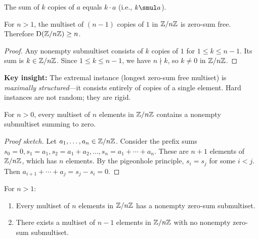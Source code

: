 \begin{theorem}
  \label{thm:sum_replicate}
  \leanok
  The sum of $k$ copies of $a$ equals $k \cdot a$ (i.e., $k \smul a$).
\end{theorem}

\begin{theorem}
  \label{thm:davenport_lower}
  \leanok
  For $n > 1$, the multiset of $(n-1)$ copies of $1$ in $\mathbb{Z}/n\mathbb{Z}$ is
  zero-sum free. Therefore $\mathrm{D}(\mathbb{Z}/n\mathbb{Z}) \geq n$.

  \begin{proof}
    Any nonempty submultiset consists of $k$ copies of $1$ for $1 \leq k \leq n-1$.
    Its sum is $k \in \mathbb{Z}/n\mathbb{Z}$. Since $1 \leq k \leq n-1$, we have $n \nmid k$,
    so $k \neq 0$ in $\mathbb{Z}/n\mathbb{Z}$.
  \end{proof}

  \textbf{Key insight:} The extremal instance (longest zero-sum free multiset)
  is \emph{maximally structured}---it consists entirely of copies of a single
  element. Hard instances are not random; they are rigid.
\end{theorem}

\begin{theorem}
  \label{thm:davenport_upper}
  For $n > 0$, every multiset of $n$ elements in $\mathbb{Z}/n\mathbb{Z}$ contains a
  nonempty submultiset summing to zero.

  \begin{proof}[Proof sketch]
    Let $a_1, \ldots, a_n \in \mathbb{Z}/n\mathbb{Z}$. Consider the prefix sums
    $s_0 = 0, s_1 = a_1, s_2 = a_1 + a_2, \ldots, s_n = a_1 + \cdots + a_n$.
    These are $n+1$ elements of $\mathbb{Z}/n\mathbb{Z}$, which has $n$ elements. By the
    pigeonhole principle, $s_i = s_j$ for some $i < j$. Then
    $a_{i+1} + \cdots + a_j = s_j - s_i = 0$.
  \end{proof}
\end{theorem}

\begin{theorem}[$\Dav(\ZZ/n\ZZ) = n$]
  \label{thm:davenport_zmod}
  For $n > 1$:
  \begin{enumerate}
    \item Every multiset of $n$ elements in $\mathbb{Z}/n\mathbb{Z}$ has a nonempty
          zero-sum submultiset.
    \item There exists a multiset of $n-1$ elements in $\mathbb{Z}/n\mathbb{Z}$ with
          no nonempty zero-sum submultiset.
  \end{enumerate}
\end{theorem}

